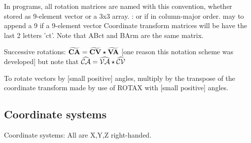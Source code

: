 \documentclass{article}
\begin{document}
In programs, all rotation matrices are named with this convention, whether stored as 9-element vector or a 3x3 array.
\qi {}:  or   if in column-major order.
\qii may to append a 9 if a  9-element vector
\qi Coordinate transform matrices  will be have the last 2 letters 'ct'. Note that ABct and BArm are the same matrix.

Successive rotations: $ \widetilde {\mathbf{ CA }}= \widetilde {\mathbf{ CV }} \star \widetilde {\mathbf{ VA }} $ [one reason this
  notation scheme was developed] but note that 
$\widehat {\mathcal{CA}} = \widehat {\mathcal{VA}} \star \widehat {\mathcal{CV}}$

To rotate vectors by [small positive] angles, multiply by the transpose of the
coordinate transform made by use of ROTAX with [small positive] angles.

\subsection{Coordinate systems \label{ternot}}
Coordinate systems: All are X,Y,Z right-handed.
\end{document}
